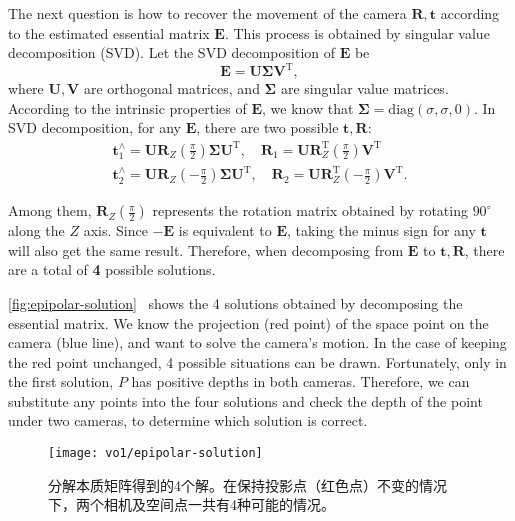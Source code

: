 The next question is how to recover the movement of the camera $\bm{R}, \bm{t}$ according to the estimated essential matrix $\bm{E}$. This process is obtained by singular value decomposition (SVD). Let the SVD decomposition of $\bm{E}$ be
\begin{equation}
\bm{E} = \bm{U} \bm{\Sigma} \bm{V}^\mathrm{T},
\end{equation}
where $\bm{U}, \bm{V}$ are orthogonal matrices, and $\bm{\Sigma}$ are singular value matrices. According to the intrinsic properties of $\bm{E}$, we know that $\bm{\Sigma} = \mathrm{diag}( \sigma, \sigma, 0 )$. In SVD decomposition, for any $\bm{E}$, there are two possible $\bm{t}, \bm{R}$:
\begin{equation}
\begin{array}{l}
\bm{t}_1^ \wedge  = \bm{U}{\bm{R}_Z}(\frac{\pi }{2}) \bm{\Sigma} {\bm{U}^\mathrm{T}}, \quad {\bm{R}_1} = \bm{U} \bm{R}_Z^\mathrm{T}(\frac{\pi }{2}){ \bm{V}^\mathrm{T}}\\
\bm{t}_2^ \wedge  = \bm{U}{\bm{R}_Z}( - \frac{\pi }{2})\bm{\Sigma} {\bm{U}^\mathrm{T}}, \quad  {\bm{R}_2} = \bm{U} \bm{R}_Z^\mathrm{T}( - \frac{\pi }{2}){\bm{V}^\mathrm{T}}.
\end{array}
\end{equation}

Among them, $\bm{R}_Z\left(\frac{\pi }{2}\right)$ represents the rotation matrix obtained by rotating $90^\circ$ along the $Z$ axis. Since $-\bm{E}$ is equivalent to $\bm{E}$, taking the minus sign for any $\bm{t}$ will also get the same result. Therefore, when decomposing from $\bm{E}$ to $\bm{t}, \bm{R}$, there are a total of \textbf{4} possible solutions.

\autoref{fig:epipolar-solution}~ shows the 4 solutions obtained by decomposing the essential matrix. We know the projection (red point) of the space point on the camera (blue line), and want to solve the camera's motion. In the case of keeping the red point unchanged, 4 possible situations can be drawn. Fortunately, only in the first solution, $P$ has positive depths in both cameras. Therefore, we can substitute any points into the four solutions and check the depth of the point under two cameras, to determine which solution is correct.

\begin{figure}[!htp]
	\centering
	\texttt{[image: vo1/epipolar-solution]}
	\caption{分解本质矩阵得到的4个解。在保持投影点（红色点）不变的情况下，两个相机及空间点一共有4种可能的情况。}
	\label{fig:epipolar-solution}
\end{figure}

